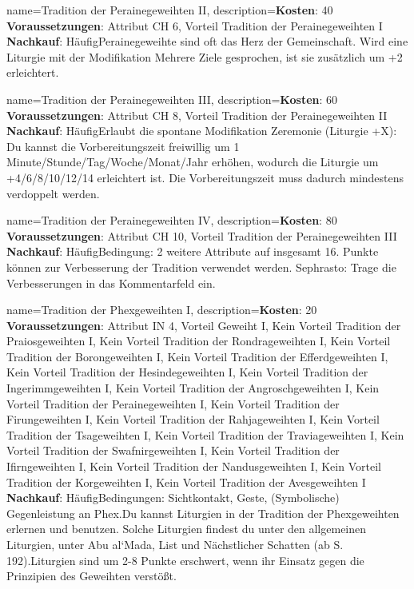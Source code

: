 {
    name={Tradition der Perainegeweihten II},
    description={\textbf{Kosten}: 40 \textbf{Voraussetzungen}: Attribut CH 6, Vorteil Tradition der Perainegeweihten I \textbf{Nachkauf}: Häufig\newline Perainegeweihte sind oft das Herz der Gemeinschaft. Wird eine Liturgie mit der Modifikation Mehrere Ziele gesprochen, ist sie zusätzlich um +2 erleichtert.}
}


{
    name={Tradition der Perainegeweihten III},
    description={\textbf{Kosten}: 60 \textbf{Voraussetzungen}: Attribut CH 8, Vorteil Tradition der Perainegeweihten II \textbf{Nachkauf}: Häufig\newline Erlaubt die spontane Modifikation Zeremonie (Liturgie +X): Du kannst die Vorbereitungszeit freiwillig um 1 Minute/Stunde/Tag/Woche/Monat/Jahr erhöhen, wodurch die Liturgie um +4/6/8/10/12/14 erleichtert ist. Die Vorbereitungszeit muss dadurch mindestens verdoppelt werden.}
}


{
    name={Tradition der Perainegeweihten IV},
    description={\textbf{Kosten}: 80 \textbf{Voraussetzungen}: Attribut CH 10, Vorteil Tradition der Perainegeweihten III \textbf{Nachkauf}: Häufig\newline Bedingung: 2 weitere Attribute auf insgesamt 16. Punkte können zur Verbesserung der Tradition verwendet werden. Sephrasto: Trage die Verbesserungen in das Kommentarfeld ein.}
}


{
    name={Tradition der Phexgeweihten I},
    description={\textbf{Kosten}: 20 \textbf{Voraussetzungen}: Attribut IN 4, Vorteil Geweiht I, Kein Vorteil Tradition der Praiosgeweihten I, Kein Vorteil Tradition der Rondrageweihten I, Kein Vorteil Tradition der Borongeweihten I, Kein Vorteil Tradition der Efferdgeweihten I, Kein Vorteil Tradition der Hesindegeweihten I, Kein Vorteil Tradition der Ingerimmgeweihten I, Kein Vorteil Tradition der Angroschgeweihten I, Kein Vorteil Tradition der Perainegeweihten I, Kein Vorteil Tradition der Firungeweihten I, Kein Vorteil Tradition der Rahjageweihten I, Kein Vorteil Tradition der Tsageweihten I, Kein Vorteil Tradition der Traviageweihten I, Kein Vorteil Tradition der Swafnirgeweihten I, Kein Vorteil Tradition der Ifirngeweihten I, Kein Vorteil Tradition der Nandusgeweihten I, Kein Vorteil Tradition der Korgeweihten I, Kein Vorteil Tradition der Avesgeweihten I \textbf{Nachkauf}: Häufig\newline Bedingungen: Sichtkontakt, Geste, (Symbolische) Gegenleistung an Phex.\newline Du kannst Liturgien in der Tradition der Phexgeweihten erlernen und benutzen. Solche Liturgien findest du unter den allgemeinen Liturgien, unter Abu al‘Mada, List und Nächstlicher Schatten (ab S. 192).\newline Liturgien sind um 2-8 Punkte erschwert, wenn ihr Einsatz gegen die Prinzipien des Geweihten verstößt.}
}


